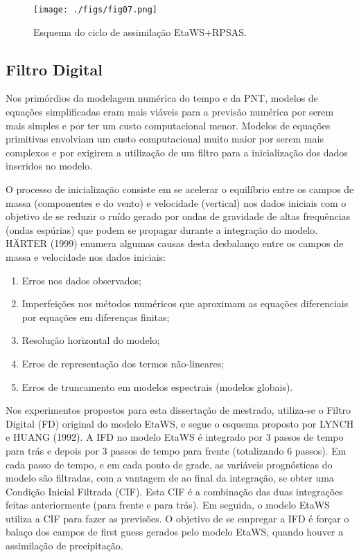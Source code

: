 \begin{figure}
	\centering
		\texttt{[image: ./figs/fig07.png]}
	  \caption{Esquema do ciclo de assimilação EtaWS+RPSAS.}
	 \label{fig07}
\end{figure}

\subsection{Filtro Digital}

Nos primórdios da modelagem numérica do tempo e da PNT, modelos de equações simplificadas eram mais viáveis para a previsão numérica por serem mais simples e por ter um custo computacional menor. Modelos de equações primitivas envolviam um custo computacional muito maior por serem mais complexos e por exigirem a utilização de um filtro para a inicialização dos dados inseridos no modelo. 

O processo de inicialização consiste em se acelerar o equilíbrio entre os campos de massa (componentes  e  do vento) e velocidade (vertical) nos dados iniciais com o objetivo de se reduzir o ruído gerado por ondas de gravidade de altas frequências (ondas espúrias) que podem se propagar durante a integração do modelo. H\"{A}RTER (1999) enumera algumas causas desta desbalanço entre os campos de massa e velocidade nos dados iniciais:

\begin{enumerate}
\item Erros nos dados observados;
\item Imperfeições nos métodos numéricos que aproximam as equações diferenciais por equações em diferenças finitas;
\item Resolução horizontal do modelo;
\item Erros de representação dos termos não-lineares;
\item Erros de truncamento em modelos espectrais (modelos globais).
\end{enumerate}

Nos experimentos propostos para esta dissertação de mestrado, utiliza-se o Filtro Digital (FD) original do modelo EtaWS, e segue o esquema proposto por LYNCH e HUANG (1992). A IFD no modelo EtaWS é integrado por 3 passos de tempo para trás e depois por 3 passos de tempo para frente (totalizando 6 passos). Em cada passo de tempo, e em cada ponto de grade, as variáveis prognósticas do modelo são filtradas, com a vantagem de ao final da integração, se obter uma Condição Inicial Filtrada (CIF). Esta CIF é a combinação das duas integrações feitas anteriormente (para frente e para trás). Em seguida, o modelo EtaWS utiliza a CIF para fazer as previsões. O objetivo de se empregar a IFD é forçar o balaço dos campos de first guess gerados pelo modelo EtaWS, quando houver a assimilação de precipitação.

